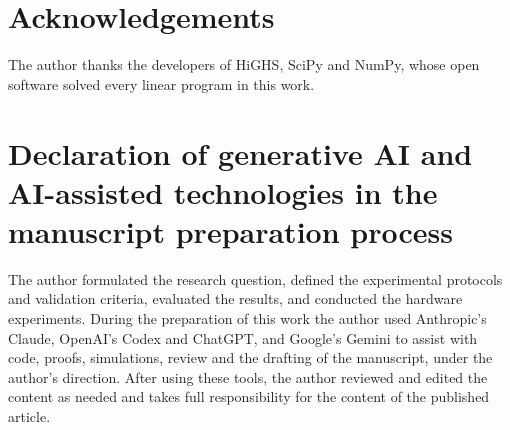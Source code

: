 \documentclass[a4paper,fleqn]{cas-dc}
\begin{document}
\section*{Acknowledgements}
The author thanks the developers of HiGHS, SciPy and NumPy, whose open software solved every linear program in this
work.

\section*{Declaration of generative AI and AI-assisted technologies in the manuscript preparation process}
The author formulated the research question, defined the experimental protocols and validation criteria, evaluated
the results, and conducted the hardware experiments. During the preparation of this work the author used Anthropic's
Claude, OpenAI's Codex and ChatGPT, and Google's Gemini to assist with code, proofs, simulations, review and the
drafting of the manuscript, under the author's direction. After using these tools, the author reviewed and edited the
content as needed and takes full responsibility for the content of the published article.



\end{document}
